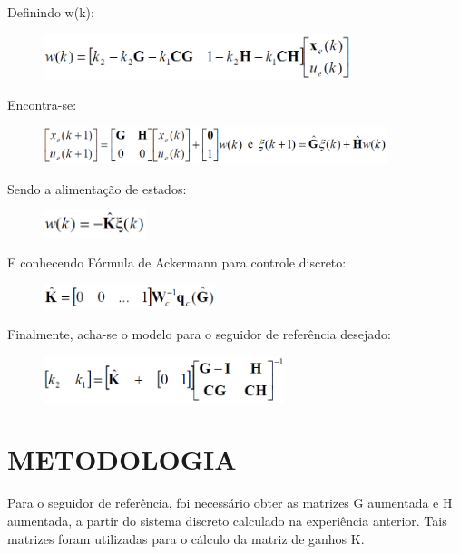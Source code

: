 \documentclass[a4paper,12pt]{article}
\begin{document}
Definindo w(k):
\begin{figure}[H]
\centering
\includegraphics[width=9cm]{imagens-6/11.png}
\end{figure}


Encontra-se:
\begin{figure}[H]
\centering
\includegraphics[width=10cm]{imagens-6/12.png}
\end{figure}


Sendo a alimentação de estados:
\begin{figure}[H]
\centering
\includegraphics[width=3cm]{imagens-6/16.png}
\end{figure}


E conhecendo Fórmula de Ackermann para controle discreto:
\begin{figure}[H]
\centering
\includegraphics[width=5cm]{imagens-6/17.png}
\end{figure}


Finalmente, acha-se o modelo para o seguidor de referência desejado:
\begin{figure}[H]
\centering
\includegraphics[width=7cm]{imagens-6/13.png}
\end{figure}


\newpage




\section{METODOLOGIA}

\hspace{4ex}Para o seguidor de referência, foi necessário obter as matrizes G aumentada e H aumentada, a partir do sistema discreto calculado na experiência anterior. Tais matrizes foram utilizadas para o cálculo da matriz de ganhos K.
\end{document}
